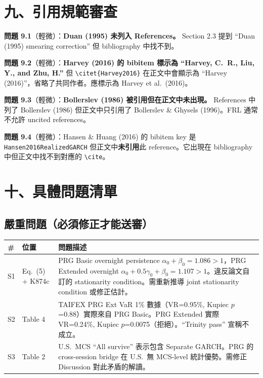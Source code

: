 \documentclass[12pt,a4paper]{article}
\begin{document}
\section{九、引用規範審查}

\textbf{問題 9.1}（輕微）：\textbf{Duan (1995) 未列入 References。} Section 2.3 提到 ``Duan (1995) smearing correction'' 但 bibliography 中找不到。

\textbf{問題 9.2}（輕微）：\textbf{Harvey (2016) 的 bibitem 標示為 ``Harvey, C.~R., Liu, Y., and Zhu, H.''} 但 \verb|\citet{Harvey2016}| 在正文中會顯示為 ``Harvey (2016)''，省略了共同作者。應標示為 Harvey et al.\ (2016)。

\textbf{問題 9.3}（輕微）：\textbf{Bollerslev (1986) 被引用但在正文中未出現。} References 中列了 Bollerslev (1986) 但正文中只引用了 Bollerslev \& Ghysels (1996)。FRL 通常不允許 uncited references。

\textbf{問題 9.4}（輕微）：Hansen \& Huang (2016) 的 bibitem key 是 \verb|Hansen2016RealizedGARCH| 但正文中\textbf{未引用}此 reference。它出現在 bibliography 中但正文中找不到對應的 \verb|\cite|。


\section{十、具體問題清單}

\subsection*{嚴重問題（必須修正才能送審）}

\begin{longtable}{p{0.5cm}p{2cm}p{11cm}}
\toprule
\# & 位置 & 問題描述 \\
\midrule
\endhead
S1 & Eq.~(5) + K874c & PRG Basic overnight persistence $\alpha_0+\beta_0 = 1.086 > 1$，PRG Extended overnight $\alpha_0+0.5\gamma_0+\beta_0 = 1.107 > 1$。違反論文自訂的 stationarity condition。需重新推導 joint stationarity condition 或修正估計。 \\
S2 & Table 4 & TAIFEX PRG Ext VaR 1\% 數據（VR=0.95\%, Kupiec $p$=0.88）實際來自 PRG Basic。PRG Extended 實際 VR=0.24\%, Kupiec $p$=0.0075（拒絕）。``Trinity pass'' 宣稱不成立。 \\
S3 & Table 2 & U.S.\ MCS ``All survive'' 表示包含 Separate GARCH。PRG 的 cross-session bridge 在 U.S.\ 無 MCS-level 統計優勢。需修正 Discussion 對此矛盾的解讀。 \\
\bottomrule
\end{longtable}
\end{document}
